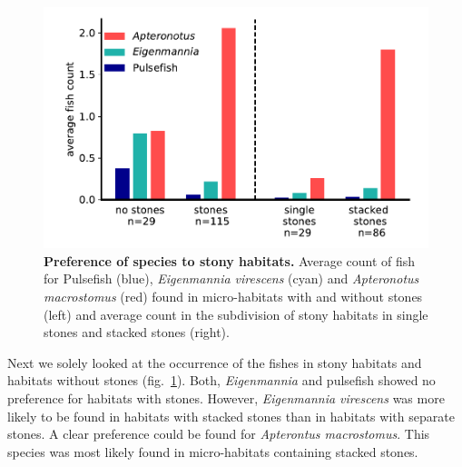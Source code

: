 \begin{figure}[H]
    \centering
    \includegraphics[width = \textwidth]{pictures/Results/more_stones_pls.pdf}
    \caption{\textbf{Preference of species to stony habitats.} Average count of fish for Pulsefish (blue), \textit{Eigenmannia virescens} (cyan) and \textit{Apteronotus macrostomus} (red) found in micro-habitats with and without stones (left) and average count in the subdivision of stony habitats in single stones and stacked stones (right). }
    \label{fig:habitat_count_stones}
\end{figure}

Next we solely looked at the occurrence of the fishes in stony habitats and habitats without stones (fig.~\ref{fig:habitat_count_stones}). Both, \textit{Eigenmannia} and pulsefish showed no preference for habitats with stones. However, \textit{Eigenmannia virescens} was more likely to be found in habitats with stacked stones than in habitats with separate stones. A clear preference could be found for \textit{Apterontus macrostomus}. This species was most likely found in micro-habitats containing stacked stones.

